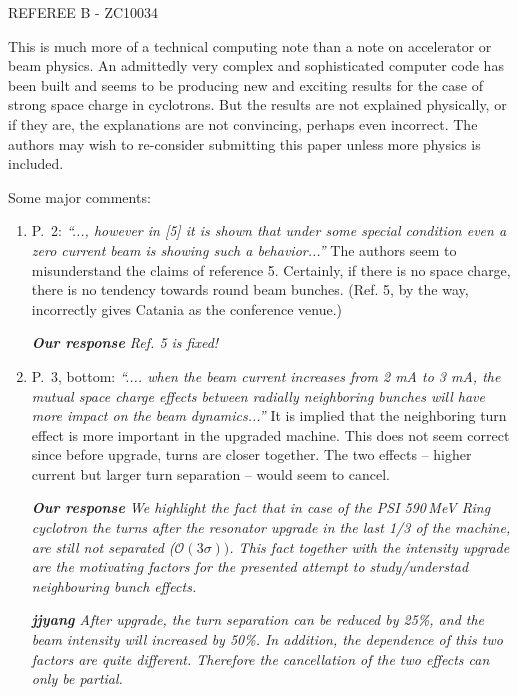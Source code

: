 \documentclass[10pt]{report}
\begin{document}
 
 REFEREE B - ZC10034
 
 This is much more of a technical computing note than a note on accelerator or
 beam physics. An admittedly very complex and sophisticated computer code has
 been built and seems to be producing new and exciting results for the case of
 strong space charge in cyclotrons. But the results are not explained
 physically, or if they are, the explanations are not convincing, perhaps even
 incorrect. The authors may wish to re-consider submitting this paper unless
 more physics is included.
 
 Some major comments:
 
 \begin{enumerate}
  \item P.\ 2: \textit{``..., however in [5] it is shown that
 under some special condition even a zero current beam is showing such a
 behavior...''} The authors seem to misunderstand the claims of reference 5.
 Certainly, if there is no space charge, there is no tendency towards round beam
 bunches. (Ref. 5, by the way, incorrectly gives Catania as the conference
 venue.)
 
 \vspace{+2mm}
 {\it {\bf Our response}  Ref. 5 is fixed!}
 \vspace{+2mm}

 
  \item P.\ 3, bottom: \textit{``.... when the
 beam current increases from 2 mA to 3 mA, the mutual space charge effects
 between radially neighboring bunches will have more impact on the beam
 dynamics...''} It is implied that the neighboring turn effect is more important
 in the upgraded machine. This does not seem correct since before upgrade, turns
 are closer together. The two effects -- higher current but larger turn
 separation -- would seem to cancel.
 
 
 \vspace{+2mm}
 {\it {\bf Our response}  We highlight the fact that in case of the PSI 590\,MeV Ring cyclotron
 the turns {\em after the resonator upgrade} in the last 1/3 of the machine, are still not separated ($\mathcal{O}(3\sigma))$. This fact together with the
 intensity upgrade are the motivating factors for the presented attempt to study/understad neighbouring bunch effects. }
 \vspace{+2mm}
 
{\it {\bf jjyang} After upgrade, the turn separation can be reduced by 25\%, and the beam intensity will increased by 50\%. In addition, the dependence of this two factors 
are quite different. Therefore the cancellation of the two effects can only be partial.}
  

\end{enumerate}
\end{document}
